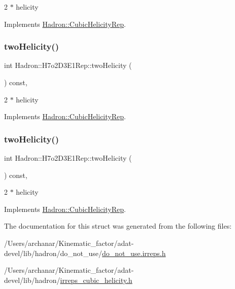 2 $\ast$ helicity 

Implements \mbox{\hyperlink{structHadron_1_1CubicHelicityRep_af507aa56fc2747eacc8cb6c96db31ecc}{Hadron\+::\+Cubic\+Helicity\+Rep}}.

\mbox{\label{structHadron_1_1H7o2D3E1Rep_af472ee043f8e74621c8a32fb43e30b5f}} 
\subsubsection{\texorpdfstring{twoHelicity()}{twoHelicity()}\hspace{0.1cm}{\footnotesize\ttfamily [2/3]}}
{\footnotesize\ttfamily int Hadron\+::\+H7o2\+D3\+E1\+Rep\+::two\+Helicity (\begin{DoxyParamCaption}{ }\end{DoxyParamCaption}) const\hspace{0.3cm}{\ttfamily [inline]}, {\ttfamily [virtual]}}

2 $\ast$ helicity 

Implements \mbox{\hyperlink{structHadron_1_1CubicHelicityRep_af507aa56fc2747eacc8cb6c96db31ecc}{Hadron\+::\+Cubic\+Helicity\+Rep}}.

\mbox{\label{structHadron_1_1H7o2D3E1Rep_af472ee043f8e74621c8a32fb43e30b5f}} 
\subsubsection{\texorpdfstring{twoHelicity()}{twoHelicity()}\hspace{0.1cm}{\footnotesize\ttfamily [3/3]}}
{\footnotesize\ttfamily int Hadron\+::\+H7o2\+D3\+E1\+Rep\+::two\+Helicity (\begin{DoxyParamCaption}{ }\end{DoxyParamCaption}) const\hspace{0.3cm}{\ttfamily [inline]}, {\ttfamily [virtual]}}

2 $\ast$ helicity 

Implements \mbox{\hyperlink{structHadron_1_1CubicHelicityRep_af507aa56fc2747eacc8cb6c96db31ecc}{Hadron\+::\+Cubic\+Helicity\+Rep}}.



The documentation for this struct was generated from the following files\+:\begin{DoxyCompactItemize}
\item 
/\+Users/archanar/\+Kinematic\+\_\+factor/adat-\/devel/lib/hadron/do\+\_\+not\+\_\+use/\mbox{\hyperlink{adat-devel_2lib_2hadron_2do__not__use_2do__not__use_8irreps_8h}{do\+\_\+not\+\_\+use.\+irreps.\+h}}\item 
/\+Users/archanar/\+Kinematic\+\_\+factor/adat-\/devel/lib/hadron/\mbox{\hyperlink{adat-devel_2lib_2hadron_2irreps__cubic__helicity_8h}{irreps\+\_\+cubic\+\_\+helicity.\+h}}\end{DoxyCompactItemize}
